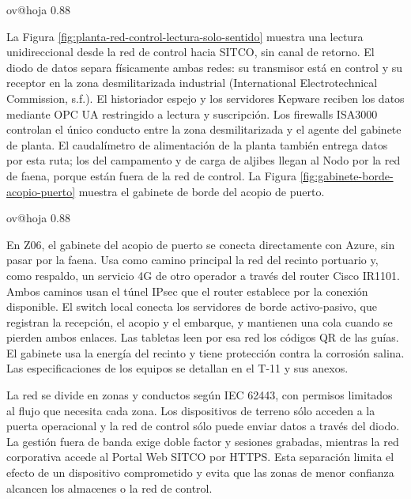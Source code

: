 \documentclass[subdoc]{../../comun/overfore}
\begin{document}
\begin{horizontal}
\csname ov@hoja\endcsname{330.2mm}{215.9mm}
\expandafter\def\csname ov@altofig\endcsname{0.88}
\end{horizontal}
La Figura \ref{fig:planta-red-control-lectura-solo-sentido} muestra una lectura unidireccional desde la red de control hacia SITCO, sin canal de retorno. El diodo de datos separa físicamente ambas redes: su transmisor está en control y su receptor en la zona desmilitarizada industrial (International Electrotechnical Commission, s.f.). El historiador espejo y los servidores Kepware reciben los datos mediante OPC UA restringido a lectura y suscripción. Los firewalls ISA3000 controlan el único conducto entre la zona desmilitarizada y el agente del gabinete de planta. El caudalímetro de alimentación de la planta también entrega datos por esta ruta; los del campamento y de carga de aljibes llegan al Nodo por la red de faena, porque están fuera de la red de control. La Figura \ref{fig:gabinete-borde-acopio-puerto} muestra el gabinete de borde del acopio de puerto.

\begin{horizontal}
\csname ov@hoja\endcsname{330.2mm}{215.9mm}
\expandafter\def\csname ov@altofig\endcsname{0.88}
\end{horizontal}
En Z06, el gabinete del acopio de puerto se conecta directamente con Azure, sin pasar por la faena. Usa como camino principal la red del recinto portuario y, como respaldo, un servicio 4G de otro operador a través del router Cisco IR1101. Ambos caminos usan el túnel IPsec que el router establece por la conexión disponible. El switch local conecta los servidores de borde activo-pasivo, que registran la recepción, el acopio y el embarque, y mantienen una cola cuando se pierden ambos enlaces. Las tabletas leen por esa red los códigos QR de las guías. El gabinete usa la energía del recinto y tiene protección contra la corrosión salina. Las especificaciones de los equipos se detallan en el T-11 y sus anexos.

La red se divide en zonas y conductos según IEC 62443, con permisos limitados al flujo que necesita cada zona. Los dispositivos de terreno sólo acceden a la puerta operacional y la red de control sólo puede enviar datos a través del diodo. La gestión fuera de banda exige doble factor y sesiones grabadas, mientras la red corporativa accede al Portal Web SITCO por HTTPS. Esta separación limita el efecto de un dispositivo comprometido y evita que las zonas de menor confianza alcancen los almacenes o la red de control.
\end{document}
